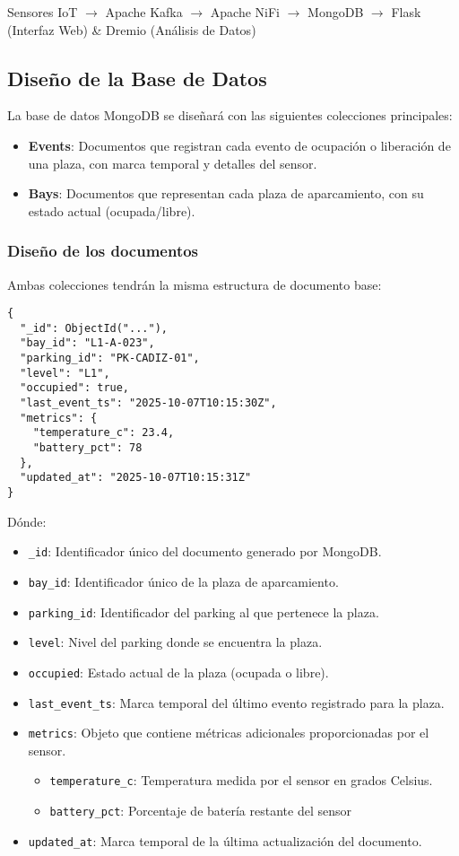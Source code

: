 \documentclass{../../../miPlantilla}
\begin{document}
Sensores IoT $\rightarrow$ Apache Kafka $\rightarrow$ Apache NiFi $\rightarrow$ MongoDB $\rightarrow$ Flask (Interfaz Web) \& Dremio (Análisis de Datos)

\subsection{Diseño de la Base de Datos}
La base de datos MongoDB se diseñará con las siguientes colecciones principales:
\begin{itemize}
  \item \textbf{Events}: Documentos que registran cada evento de ocupación o liberación de una plaza, con marca temporal y detalles del sensor.
  \item \textbf{Bays}: Documentos que representan cada plaza de aparcamiento, con su estado actual (ocupada/libre).
\end{itemize}

\subsubsection{Diseño de los documentos}
Ambas colecciones tendrán la misma estructura de documento base:
\begin{lstlisting}
{
  "_id": ObjectId("..."),
  "bay_id": "L1-A-023",
  "parking_id": "PK-CADIZ-01",
  "level": "L1",
  "occupied": true,
  "last_event_ts": "2025-10-07T10:15:30Z",
  "metrics": {
    "temperature_c": 23.4,
    "battery_pct": 78
  },
  "updated_at": "2025-10-07T10:15:31Z"
}
\end{lstlisting}

\newpage

Dónde:
\begin{itemize}
  \item \texttt{\_id}: Identificador único del documento generado por MongoDB.
  \item \texttt{bay\_id}: Identificador único de la plaza de aparcamiento.
  \item \texttt{parking\_id}: Identificador del parking al que pertenece la plaza.
  \item \texttt{level}: Nivel del parking donde se encuentra la plaza.
  \item \texttt{occupied}: Estado actual de la plaza (ocupada o libre).
  \item \texttt{last\_event\_ts}: Marca temporal del último evento registrado para la plaza.
  \item \texttt{metrics}: Objeto que contiene métricas adicionales proporcionadas por el sensor.
  \begin{itemize}
    \item \texttt{temperature\_c}: Temperatura medida por el sensor en grados Celsius.
    \item \texttt{battery\_pct}: Porcentaje de batería restante del sensor
  \end{itemize} 
  \item \texttt{updated\_at}: Marca temporal de la última actualización del documento.
\end{itemize}
\end{document}
